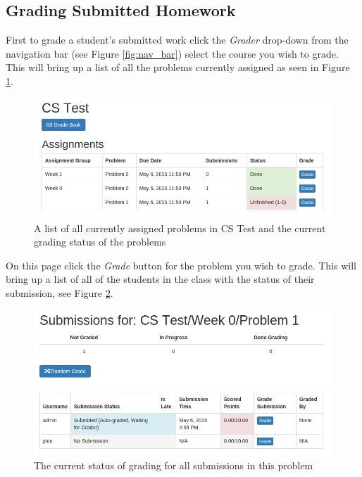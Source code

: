 \documentclass[11pt]{report}
\begin{document}
\subsection{Grading Submitted Homework}
First to grade a student's submitted work click the \emph{Grader} drop-down from the navigation bar 
(see Figure \ref{fig:nav_bar}) select the course you wish to grade. This will bring up a list of all the 
problems currently assigned as seen in Figure \ref{fig:grutor_problems}.

\begin{figure}[h]
\centering
\includegraphics[width=\textwidth,height=\textheight,keepaspectratio]{diagrams/grutor_problems}
\caption{A list of all currently assigned problems in CS Test and the current grading status of the problems}
\label{fig:grutor_problems}
\end{figure}

On this page click the \emph{Grade} button for the problem you wish to grade. This will bring up a list of all
of the students in the class with the status of their submission, see Figure \ref{fig:grutor_problem_list}. 

\begin{figure}[h]
\centering
\includegraphics[width=\textwidth,height=\textheight,keepaspectratio]{diagrams/grutor_problem_list}
\caption{The current status of grading for all submissions in this problem}
\label{fig:grutor_problem_list}
\end{figure}
\end{document}
